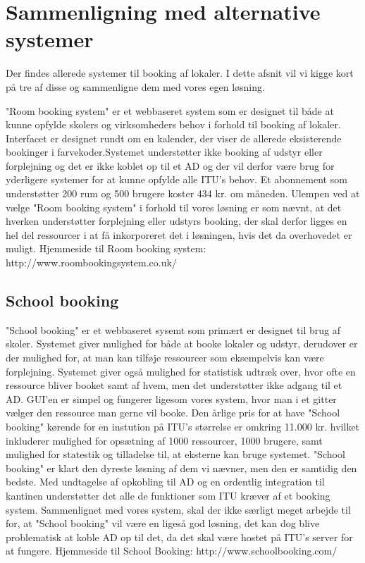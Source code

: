 \section{Sammenligning med alternative systemer}
Der findes allerede systemer til booking af lokaler. I dette afsnit vil vi kigge kort på tre af disse og sammenligne dem med vores egen løsning.

"Room booking system" er et webbaseret system som er designet til både at kunne opfylde skolers og virksomheders behov i forhold til booking af lokaler. Interfacet er designet rundt om en kalender, der viser de allerede eksisterende bookinger i farvekoder.Systemet understøtter ikke booking af udstyr eller forplejning og det er ikke koblet op til et AD og der vil derfor være brug for yderligere systemer for at kunne opfylde alle ITU's behov. Et abonnement som understøtter 200 rum og 500 brugere koster 434 kr. om måneden. Ulempen ved at vælge "Room booking system" i forhold til vores løsning er som nævnt, at det hverken understøtter forplejning eller udstyrs booking, der skal derfor ligges en hel del ressourcer i at få inkorporeret det i løsningen, hvis det da overhovedet er muligt.
Hjemmeside til Room booking system: http://www.roombookingsystem.co.uk/

\subsection{School booking}
"School booking" er et webbaseret sysemt som primært er designet til brug af skoler. Systemet giver mulighed for både at booke lokaler og udstyr, derudover er der mulighed for, at man kan tilføje ressourcer som eksempelvis kan være forplejning. Systemet giver også mulighed for statistisk udtræk over, hvor ofte en ressource bliver booket samt af hvem, men det understøtter ikke adgang til et AD. GUI'en er simpel og fungerer ligesom vores system, hvor man i et gitter vælger den ressource man gerne vil booke. Den årlige pris for at have "School booking" kørende for en instution på ITU's størrelse er omkring 11.000 kr. hvilket inkluderer mulighed for opsætning af 1000 ressourcer, 1000 brugere, samt mulighed for statestik og tilladelse til, at eksterne kan bruge systemet. "School booking" er klart den dyreste løsning af dem vi nævner, men den er samtidig den bedste. Med undtagelse af opkobling til AD og en ordentlig integration til kantinen understøtter det alle de funktioner som ITU kræver af et booking system. Sammenlignet med vores system, skal der ikke særligt meget arbejde til for, at "School booking" vil være en ligeså god løsning, det kan dog blive problematisk at koble AD op til det, da det skal være hostet på ITU's server for at fungere. 
Hjemmeside til School Booking: http://www.schoolbooking.com/

